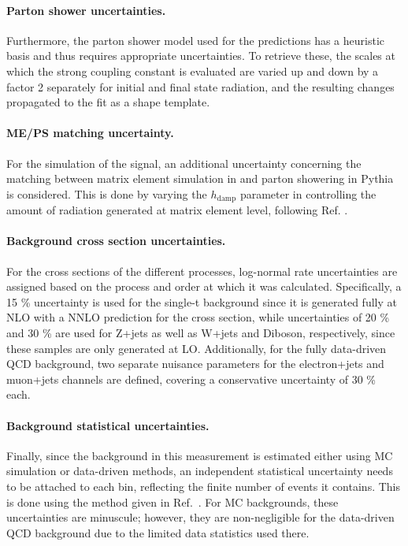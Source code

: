 \paragraph{Parton shower uncertainties.}

Furthermore, the parton shower model used for the predictions has a heuristic basis and thus requires appropriate uncertainties. To retrieve these, the scales at which the strong coupling constant is evaluated are varied up and down by a factor 2 separately for initial and final state radiation, and the resulting changes propagated to the fit as a shape template.

\paragraph{ME/PS matching uncertainty.}

For the simulation of the \ttbar signal, an additional uncertainty concerning the matching between matrix element simulation in \powheg and parton showering in Pythia is considered. This is done by varying the $h_{\mathrm{damp}}$ parameter in \powheg controlling the amount of radiation generated at matrix element level, following Ref. \cite{CMS:TOP-16-021}.

\paragraph{Background cross section uncertainties.}

For the cross sections of the different processes, log-normal rate uncertainties are assigned based on the process and order at which it was calculated. Specifically, a 15 \% uncertainty is used for the single-t background since it is generated fully at NLO with a NNLO prediction for the cross section, while uncertainties of 20 \% and 30 \% are used for Z+jets as well as W+jets and Diboson, respectively, since these samples are only generated at LO. Additionally, for the fully data-driven QCD background, two separate nuisance parameters for the electron+jets and muon+jets channels are defined, covering a conservative uncertainty of 30 \% each.

\paragraph{Background statistical uncertainties.}

Finally, since the background in this measurement is estimated either using MC simulation or data-driven methods, an independent statistical uncertainty needs to be attached to each bin, reflecting the finite number of events it contains. This is done using the method given in Ref.~\cite{Barlow:1993dm}. For MC backgrounds, these uncertainties are minuscule; however, they are non-negligible for the data-driven QCD background due to the limited data statistics used there.

